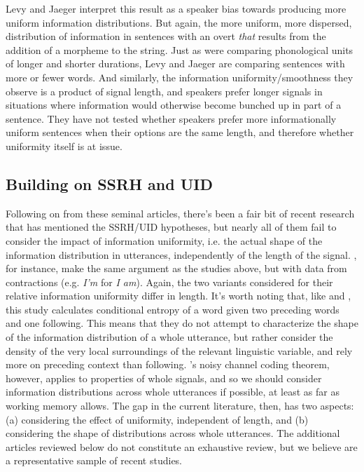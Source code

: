 \documentclass[12pt]{article}
\begin{document}
Levy and Jaeger interpret this result as a speaker bias towards producing more uniform information distributions. But again, the more uniform, more dispersed, distribution of information in sentences with an overt \textsl{that} results from the addition of a morpheme to the string. Just as \citet{aylettturk2004} were comparing phonological units of longer and shorter durations, Levy and Jaeger are comparing sentences with more or fewer words. And similarly, the information uniformity/smoothness they observe is a product of signal length, and speakers prefer longer signals in situations where information would otherwise become bunched up in part of a sentence. They have not tested whether speakers prefer more informationally uniform sentences when their options are the same length, and therefore whether uniformity itself is at issue.


\subsection{Building on SSRH and UID}

Following on from these seminal articles, there's been a fair bit of recent research that has mentioned the SSRH/UID hypotheses, but nearly all of them fail to consider the impact of information uniformity, i.e. the actual shape of the information distribution in utterances, independently of the length of the signal. \citet{frankjaeger2008}, for instance, make the same argument as the studies above, but with data from contractions (e.g. \textsl{I'm} for \textsl{I am}). Again, the two variants considered for their relative information uniformity differ in length. It's worth noting that, like \citet{levyjaeger2007} and \citet{jaeger2010}, this study calculates conditional entropy of a word given two preceding words and one following. This means that they do not attempt to characterize the shape of the information distribution of a whole utterance, but rather consider the density of the very local surroundings of the relevant linguistic variable, and rely more on preceding context than following. \citet{shannon1948}'s noisy channel coding theorem, however, applies to properties of whole signals, and so we should consider information distributions across whole utterances if possible, at least as far as working memory allows. The gap in the current literature, then, has two aspects: (a) considering the effect of uniformity, independent of length, and (b) considering the shape of distributions across whole utterances. The additional articles reviewed below do not constitute an exhaustive review, but we believe are a representative sample of recent studies.
\end{document}
